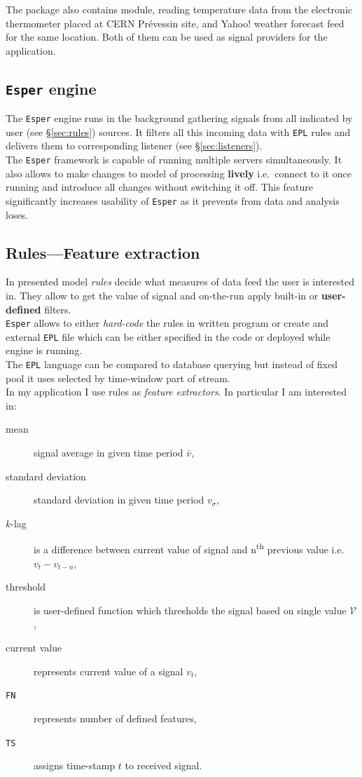 \documentclass[11pt, letterpaper]{article}            %
\newcommand{\ts}{\textsuperscript}
\begin{document}
The package also contains module, reading temperature data from the electronic thermometer placed at CERN Prévessin site, and Yahoo! weather forecast feed for the same location. Both of them can be used as signal providers for the application.

\subsection{\texttt{Esper} engine}
The \texttt{Esper} engine runs in the background gathering signals from all indicated by user (see §\ref{sec:rules}) sources. It filters all this incoming data with \texttt{EPL} rules and delivers them to corresponding listener (see §\ref{sec:listeners}).\\
The \texttt{Esper} framework is capable of running multiple servers simultaneously. It also allows to make changes to model of processing \textbf{lively} i.e.\ connect to it once running and introduce all changes without switching it off. This feature significantly increases usability of \texttt{Esper} as it prevents from data and analysis loses.\\

\subsection{Rules---Feature extraction\label{sec:rules}}
In presented model \emph{rules} decide what measures of data feed the user is interested in. They allow to get the value of signal and on-the-run apply built-in or \textbf{user-defined} filters.\\
\texttt{Esper} allows to either \emph{hard-code} the rules in written program or create and external \texttt{EPL} file which can be either specified in the code or deployed while engine is running.\\
The \texttt{EPL} language can be compared to database querying but instead of fixed pool it uses selected by time-window part of stream.\\

In my application I use rules as \emph{feature extractors}. In particular I am interested in:
\begin{description}
  \item[mean] signal average in given time period $\bar{v}$,
  \item[standard deviation] standard deviation in given time period $v_\sigma$,
  \item[$k$-lag] is a difference between current value of signal and n\ts{th} previous value i.e.\ $v_t - v_{t-n}$,
  \item[threshold] is user-defined function which thresholds the signal based on single value $\mathscr{V}$,
  \item[current value] represents current value of a signal $v_t$,
  \item[\texttt{FN}] represents number of defined features,
  \item[\texttt{TS}] assigns time-stamp $t$ to received signal.
\end{description}
\end{document}
